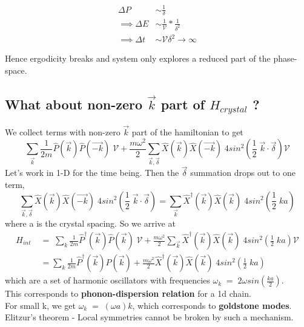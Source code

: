 \documentclass[12pt]{article}
\begin{document}
\begin{align*}
    \Delta P &\sim \frac{1}{\delta}\\
    \implies \Delta E &\sim \frac{1}{\mathcal{V}}*\frac{1}{\delta^2}\\
    \implies \Delta t &\sim \mathcal{V}\delta^2 \to\infty
\end{align*}

Hence ergodicity breaks and system only explores a reduced part of the phase-space.
\newpage

\subsection{What about non-zero $\vec{k}$ part of $H_{crystal}$ ?}
We collect terms with non-zero $\vec{k}$ part of the hamiltonian to get
\begin{equation}
    \sum_{\Vec{k}} \frac{1}{2m}\hat{P}(\Vec{k}) \hat{P}(\Vec{-k}) \;\mathcal{V} + \frac{m\omega^2}{2} \sum_{\vec{k}, \vec{\delta}} \hat{X}(\vec{k})\hat{X}(\vec{-k})\; 4sin^2(\frac{1}{2}\;\vec{k}\cdot\vec{\delta}) \mathcal{V}
\end{equation}
Let's work in 1-D for the time being. Then the $\vec{\delta}$ summation drops out to one term,
\begin{equation*}
   \sum_{\vec{k}, \vec{\delta}} \hat{X}(\vec{k})\hat{X}(\vec{-k})\; 4sin^2(\frac{1}{2}\;\vec{k}\cdot\vec{\delta}) = \sum_{\vec{k}} \hat{X}^{\dagger}(\vec{k})\hat{X}(\vec{k})\; 4sin^2(\frac{1}{2}\;ka)
\end{equation*}
where a is the crystal spacing. So we arrive at
\begin{align}
    H_{int}\;&=\;\sum_{{k}} \displaystyle{\frac{1}{2m}}\hat{P}^{\dagger}(\Vec{k}) \hat{P}(\Vec{k}) \;\mathcal{V} + \frac{m\omega^2}{2} \sum_{\vec{k}} \hat{X}^{\dagger}(\vec{k})\hat{X}(\vec{k})\; 4sin^2(\frac{1}{2}\;ka)\mathcal{V}\\
    &= \sum_{{k}}\displaystyle{\frac{1}{2m}}\hat{P}^{\dagger}(\Vec{k}) \hat{P}(\Vec{k}) +  \frac{m\omega^2}{2} \hat{X}^{\dagger}(\vec{k})\hat{X}(\vec{k})\; 4sin^2(\frac{1}{2}\;ka)
\end{align}
which are a set of harmonic oscillators with frequencies $\omega_{k}\;=\;2\omega sin(\displaystyle{\frac{ka}{2}})$. \\
This corresponds to\textbf{ phonon-dispersion relation} for a 1d chain.\\
For small k, we get $\omega_k\;=\;(\omega a)k $, which corresponds to \textbf{goldstone modes}.\\
\newline
Elitzur's theorem - Local symmetries cannot be broken by such a mechanism.
\end{document}

